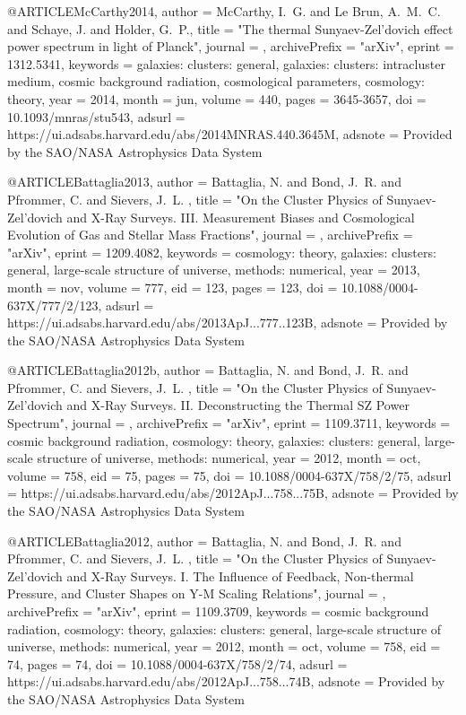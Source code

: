 \documentclass[useAMS,usenatbib]{mnras}
\begin{document}
{{{{{{{{{{{{{{@ARTICLE{McCarthy2014,
   author = {{McCarthy}, I.~G. and {Le Brun}, A.~M.~C. and {Schaye}, J. and 
	{Holder}, G.~P.},
    title = "{The thermal Sunyaev-Zel'dovich effect power spectrum in light of Planck}",
  journal = {\mnras},
archivePrefix = "arXiv",
   eprint = {1312.5341},
 keywords = {galaxies: clusters: general, galaxies: clusters: intracluster medium, cosmic background radiation, cosmological parameters, cosmology: theory},
     year = 2014,
    month = jun,
   volume = 440,
    pages = {3645-3657},
      doi = {10.1093/mnras/stu543},
   adsurl = {https://ui.adsabs.harvard.edu/abs/2014MNRAS.440.3645M},
  adsnote = {Provided by the SAO/NASA Astrophysics Data System}
}

@ARTICLE{Battaglia2013,
   author = {{Battaglia}, N. and {Bond}, J.~R. and {Pfrommer}, C. and {Sievers}, J.~L.
	},
    title = "{On the Cluster Physics of Sunyaev-Zel'dovich and X-Ray Surveys. III. Measurement Biases and Cosmological Evolution of Gas and Stellar Mass Fractions}",
  journal = {\apj},
archivePrefix = "arXiv",
   eprint = {1209.4082},
 keywords = {cosmology: theory, galaxies: clusters: general, large-scale structure of universe, methods: numerical},
     year = 2013,
    month = nov,
   volume = 777,
      eid = {123},
    pages = {123},
      doi = {10.1088/0004-637X/777/2/123},
   adsurl = {https://ui.adsabs.harvard.edu/abs/2013ApJ...777..123B},
  adsnote = {Provided by the SAO/NASA Astrophysics Data System}
}

@ARTICLE{Battaglia2012b,
   author = {{Battaglia}, N. and {Bond}, J.~R. and {Pfrommer}, C. and {Sievers}, J.~L.
	},
    title = "{On the Cluster Physics of Sunyaev-Zel'dovich and X-Ray Surveys. II. Deconstructing the Thermal SZ Power Spectrum}",
  journal = {\apj},
archivePrefix = "arXiv",
   eprint = {1109.3711},
 keywords = {cosmic background radiation, cosmology: theory, galaxies: clusters: general, large-scale structure of universe, methods: numerical},
     year = 2012,
    month = oct,
   volume = 758,
      eid = {75},
    pages = {75},
      doi = {10.1088/0004-637X/758/2/75},
   adsurl = {https://ui.adsabs.harvard.edu/abs/2012ApJ...758...75B},
  adsnote = {Provided by the SAO/NASA Astrophysics Data System}
}

@ARTICLE{Battaglia2012,
   author = {{Battaglia}, N. and {Bond}, J.~R. and {Pfrommer}, C. and {Sievers}, J.~L.
	},
    title = "{On the Cluster Physics of Sunyaev-Zel'dovich and X-Ray Surveys. I. The Influence of Feedback, Non-thermal Pressure, and Cluster Shapes on Y-M Scaling Relations}",
  journal = {\apj},
archivePrefix = "arXiv",
   eprint = {1109.3709},
 keywords = {cosmic background radiation, cosmology: theory, galaxies: clusters: general, large-scale structure of universe, methods: numerical},
     year = 2012,
    month = oct,
   volume = 758,
      eid = {74},
    pages = {74},
      doi = {10.1088/0004-637X/758/2/74},
   adsurl = {https://ui.adsabs.harvard.edu/abs/2012ApJ...758...74B},
  adsnote = {Provided by the SAO/NASA Astrophysics Data System}
}

}}}}}}}}}}}}}}
\end{document}
